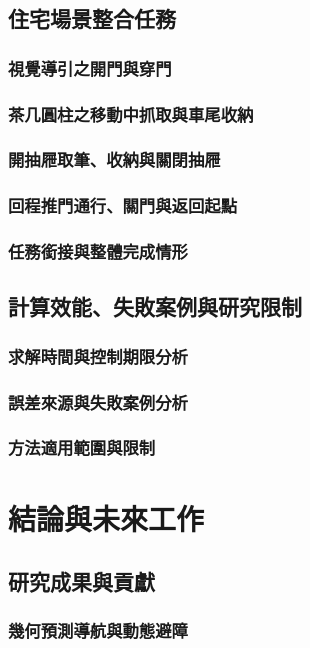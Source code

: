 \section{住宅場景整合任務}
\subsection{視覺導引之開門與穿門}
\subsection{茶几圓柱之移動中抓取與車尾收納}
\subsection{開抽屜取筆、收納與關閉抽屜}
\subsection{回程推門通行、關門與返回起點}
\subsection{任務銜接與整體完成情形}

\section{計算效能、失敗案例與研究限制}
\subsection{求解時間與控制期限分析}
\subsection{誤差來源與失敗案例分析}
\subsection{方法適用範圍與限制}

\chapter{結論與未來工作}

\section{研究成果與貢獻}
\subsection{幾何預測導航與動態避障}
